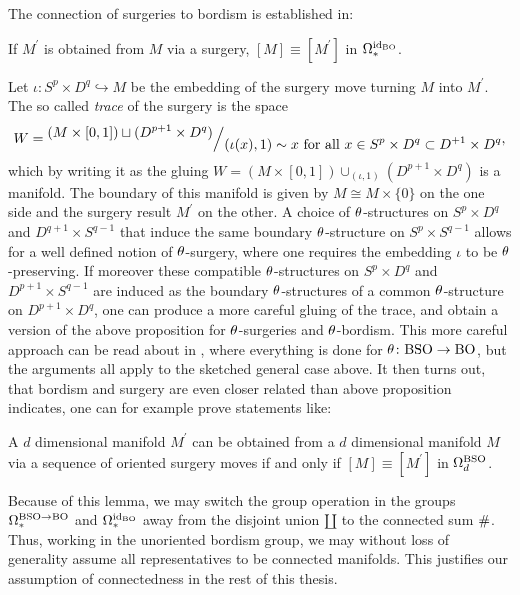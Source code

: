 The connection of surgeries to bordism is established in:
\begin{thesisprop}
    If $M^\prime$ is obtained from $M$ via a surgery, $[M] \equiv [M^\prime]$ in $\Omega_\ast^{\operatorname{id}_{\mathrm{BO}}}$.
\end{thesisprop}
\prf
Let $\iota\colon S^p \times D^q \hookrightarrow M$ be the embedding of the surgery move turning $M$ into $M^\prime$.
The so called \emph{trace} of the surgery is the space
\begin{equation*}
    W = \quotient{(M \times [0,1]) \amalg (D^{p+1}\times D^q)}{(\iota(x),1) \sim x \text{ for all } x\in S^p\times D^q \subset D^{+1}\times D^q},
\end{equation*}
which by writing it as the gluing $W = (M\times[0,1])\cup_{(\iota ,1)} (D^{p+1}\times D^q)$ is a manifold.
The boundary of this manifold is given by $M\cong M\times\{0\}$ on the one side and the surgery result $M^\prime$ on the other.
\endprf
A choice of $\theta$-structures on $S^p\times D^q$ and $D^{q+1}\times S^{q-1}$ that induce the same boundary $\theta$-structure on $S^p\times S^{q-1}$ allows for a well defined notion of $\theta$-surgery, where one requires the embedding $\iota$ to be $\theta$-preserving.
If moreover these compatible $\theta$-structures on $S^p\times D^q$ and $D^{p+1}\times S^{q-1}$ are induced as the boundary $\theta$-structures of a common $\theta$-structure on $D^{p+1}\times D^q$, one can produce a more careful gluing of the trace, and obtain a version of the above proposition for $\theta$-surgeries and $\theta$-bordism.
This more careful approach can be read about in \cite{milnor:surg}, where everything is done for $\theta\colon \mathrm{BSO} \to \mathrm{BO}$, but the arguments all apply to the sketched general case above.
It then turns out, that bordism and surgery are even closer related than above proposition indicates, one can for example prove statements like:
\begin{thesislemma}
    A $d$ dimensional manifold $M^\prime$ can be obtained from a $d$ dimensional manifold $M$ via a sequence of oriented surgery moves if and only if $[M] \equiv [M^\prime]$ in $\Omega_d^{\mathrm{BSO}}$.
\end{thesislemma}
Because of this lemma, we may switch the group operation in the groups $\Omega_\ast^{\mathrm{BSO}\to\mathrm{BO}}$ and $\Omega_\ast^{\operatorname{id}_{\mathrm{BO}}}$ away from the disjoint union $\amalg$ to the connected sum $\mathrel\#$.
Thus, working in the unoriented bordism group, we may without loss of generality assume all representatives to be connected manifolds.
This justifies our assumption of connectedness in the rest of this thesis.

